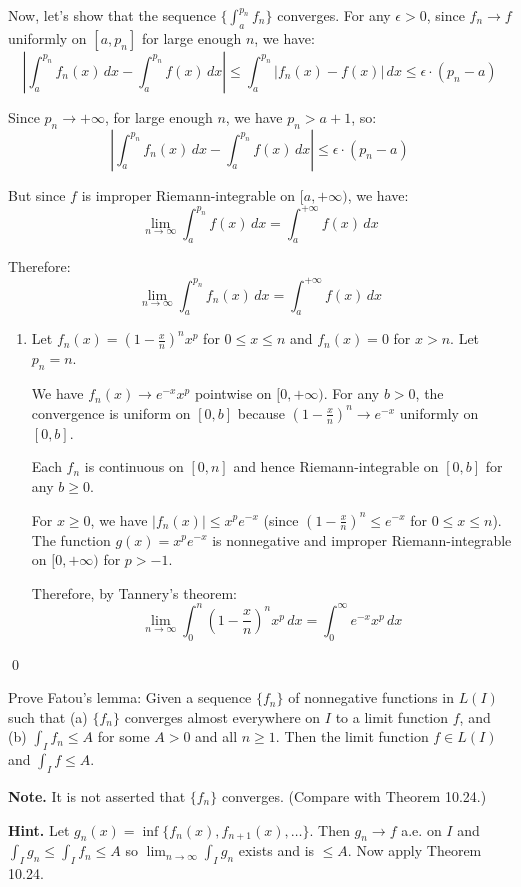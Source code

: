 Now, let's show that the sequence $\{\int_a^{p_n} f_n\}$ converges. For any $\epsilon > 0$, since $f_n \to f$ uniformly on $[a, p_n]$ for large enough $n$, we have:
\[|\int_a^{p_n} f_n(x) \, dx - \int_a^{p_n} f(x) \, dx| \leq \int_a^{p_n} |f_n(x) - f(x)| \, dx \leq \epsilon \cdot (p_n - a)\]

Since $p_n \to +\infty$, for large enough $n$, we have $p_n > a + 1$, so:
\[|\int_a^{p_n} f_n(x) \, dx - \int_a^{p_n} f(x) \, dx| \leq \epsilon \cdot (p_n - a)\]

But since $f$ is improper Riemann-integrable on $[a,+\infty)$, we have:
\[\lim_{n \to \infty} \int_a^{p_n} f(x) \, dx = \int_a^{+\infty} f(x) \, dx\]

Therefore:
\[\lim_{n \to \infty} \int_a^{p_n} f_n(x) \, dx = \int_a^{+\infty} f(x) \, dx\]

\begin{enumerate}[label=(\alph*),resume]
\item Let $f_n(x) = (1 - \frac{x}{n})^n x^p$ for $0 \leq x \leq n$ and $f_n(x) = 0$ for $x > n$. Let $p_n = n$.

We have $f_n(x) \to e^{-x}x^p$ pointwise on $[0,+\infty)$. For any $b > 0$, the convergence is uniform on $[0,b]$ because $(1 - \frac{x}{n})^n \to e^{-x}$ uniformly on $[0,b]$.

Each $f_n$ is continuous on $[0,n]$ and hence Riemann-integrable on $[0,b]$ for any $b \geq 0$.

For $x \geq 0$, we have $|f_n(x)| \leq x^p e^{-x}$ (since $(1 - \frac{x}{n})^n \leq e^{-x}$ for $0 \leq x \leq n$). The function $g(x) = x^p e^{-x}$ is nonnegative and improper Riemann-integrable on $[0,+\infty)$ for $p > -1$.

Therefore, by Tannery's theorem:
\[\lim_{n \to \infty} \int_{0}^{n} \left( 1 - \frac{x}{n} \right)^n x^p \, dx = \int_{0}^{\infty} e^{-x}x^p \, dx\]
\end{enumerate}\qed


\begin{problembox}
Prove Fatou's lemma: Given a sequence $\{f_n\}$ of nonnegative functions in $L(I)$ such that (a) $\{f_n\}$ converges almost everywhere on $I$ to a limit function $f$, and (b) $\int_I f_n \leq A$ for some $A > 0$ and all $n \geq 1$. Then the limit function $f \in L(I)$ and $\int_I f \leq A$.

\textbf{Note.} It is not asserted that $\{f_n\}$ converges. (Compare with Theorem 10.24.)

\textbf{Hint.} Let $g_n(x) = \inf \{f_n(x), f_{n+1}(x), \ldots\}$. Then $g_n \to f$ a.e. on $I$ and $\int_I g_n \leq \int_I f_n \leq A$ so $\lim_{n \to \infty} \int_I g_n$ exists and is $\leq A$. Now apply Theorem 10.24.
\end{problembox}

